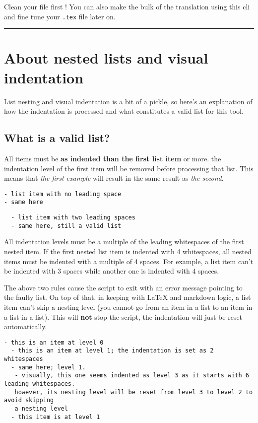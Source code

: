 \documentclass[a4paper, 12pt, twoside]{book}
\begin{document}
Clean your file first ! You can also make the bulk of the translation using this cli and fine tune your \texttt{.tex} 
file later on.

\par\noindent\rule{\linewidth}{0.4pt}
\section*{About nested lists and visual indentation}

List nesting and visual indentation is a bit of a pickle, so here's an explanation of how
the indentation is processed and what constitutes a valid list for this tool.
\subsection*{What is a valid list?}

All items must be \textbf{as indented than the first list item} or more. the indentation level of the first item
will be removed before processing that list. This means that \textit{the first example} will result in the same
result as \textit{the second}.

\begin{lstlisting}
- list item with no leading space
- same here
\end{lstlisting}

\begin{lstlisting}
  - list item with two leading spaces
  - same here, still a valid list
\end{lstlisting}

All indentation levels must be a multiple of the leading whitespaces of the first nested item. If the first nested 
list item is indented with 4 whitespaces, all nested items must be indented with a multiple of 4 spaces. For example,
a list item can't be indented with 3 spaces while another one is indented with 4 spaces.

The above two rules cause the script to exit with an error message pointing to the faulty list. On top of that,
in keeping with LaTeX and markdown logic, a list item can't skip a nesting level (you cannot go from an item in a list
to an item in a list in a list). This will \textbf{not} stop the script, the indentation will just be reset automatically.

\begin{lstlisting}
- this is an item at level 0
  - this is an item at level 1; the indentation is set as 2 whitespaces
  - same here; level 1.
   - visually, this one seems indented as level 3 as it starts with 6 leading whitespaces.
   however, its nesting level will be reset from level 3 to level 2 to avoid skipping
   a nesting level
  - this item is at level 1
\end{lstlisting}
\end{document}
